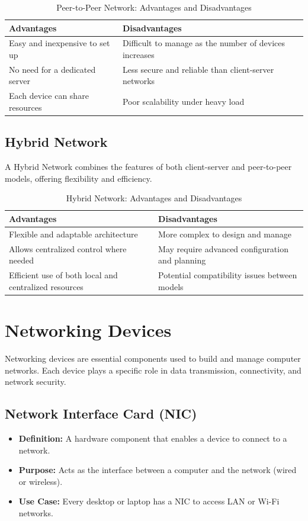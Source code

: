 \begin{table}[H]
\centering
\caption{Peer-to-Peer Network: Advantages and Disadvantages}
\begin{tabularx}{\linewidth}{|X|X|}
\hline
\textbf{Advantages} & \textbf{Disadvantages} \\
\hline
Easy and inexpensive to set up & Difficult to manage as the number of devices increases \\
\hline
No need for a dedicated server & Less secure and reliable than client-server networks \\
\hline
Each device can share resources & Poor scalability under heavy load \\
\hline
\end{tabularx}
\end{table}

\subsection{Hybrid Network}
A Hybrid Network combines the features of both client-server and peer-to-peer models, offering flexibility and efficiency.

\begin{table}[H]
\centering
\caption{Hybrid Network: Advantages and Disadvantages}
\begin{tabularx}{\linewidth}{|X|X|}
\hline
\textbf{Advantages} & \textbf{Disadvantages} \\
\hline
Flexible and adaptable architecture & More complex to design and manage \\
\hline
Allows centralized control where needed & May require advanced configuration and planning \\
\hline
Efficient use of both local and centralized resources & Potential compatibility issues between models \\
\hline
\end{tabularx}
\end{table}



\section{Networking Devices}

Networking devices are essential components used to build and manage computer networks. Each device plays a specific role in data transmission, connectivity, and network security.

\subsection{Network Interface Card (NIC)}
\begin{itemize}[leftmargin=1.5cm]
  \item \textbf{Definition:} A hardware component that enables a device to connect to a network.
  \item \textbf{Purpose:} Acts as the interface between a computer and the network (wired or wireless).
  \item \textbf{Use Case:} Every desktop or laptop has a NIC to access LAN or Wi-Fi networks.
\end{itemize}

